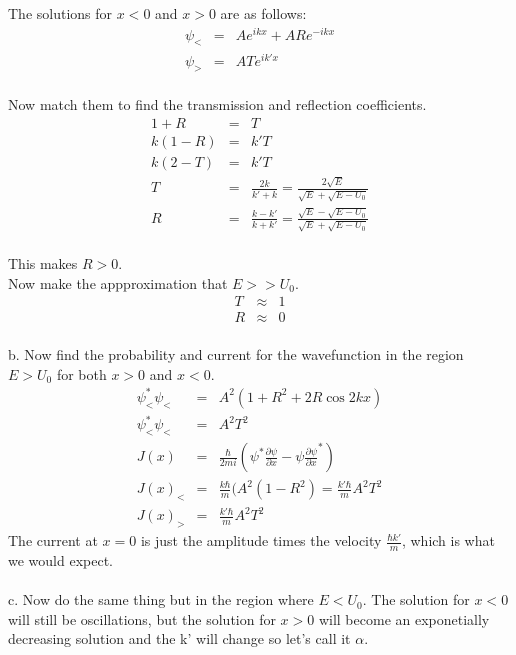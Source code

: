 \documentclass[11pt]{amsart}
\begin{document}
The solutions for $x<0$ and $x>0$ are as follows: \\
\begin{eqnarray*} 
\psi_{<} &=& Ae^{ikx}+ARe^{-ikx} \\
\psi_{>} &=& ATe^{ik'x} 
\end{eqnarray*} \\
Now match them to find the transmission and reflection coefficients. \\
\begin{eqnarray*} 
1+R &=& T \\
k(1-R) &=& k'T \\
 k(2-T) &=& k'T \\
T &=& \frac{2k}{k'+k} = \frac{2\sqrt{E}}{\sqrt{E}+\sqrt{E-U_{0}}} \\
R &=& \frac{k-k'}{k+k'} = \frac{\sqrt{E}-\sqrt{E-U_{0}}}{\sqrt{E}+\sqrt{E-U_{0}}} 
\end{eqnarray*} \\
This makes $R>0$. \\ Now make the appproximation that $E>>U_{0}$. \\
\begin{eqnarray*} 
T &\approx& 1 \\
R &\approx& 0 
\end{eqnarray*} \\
b. Now find the probability and current for the wavefunction in the region $E>U_{0}$ for both $x>0$ and $x<0$. \\
\begin{eqnarray*}
\psi_{<}^{*}\psi_{<} &=&  A^{2}(1+R^{2}+2R\cos{2kx}) \\ 
\psi_{<}^{*}\psi_{<} &=& A^{2}T^{2} \\
J(x) &=& \frac{\hbar}{2mi}(\psi^{*}\frac{\partial{\psi}}{\partial{x}}-\psi\frac{\partial{\psi}}{\partial{x}}^{*}) \\
J(x)_{<} &=& \frac{k\hbar}{m}(A^{2}(1-R^{2}) = \frac{k'\hbar}{m}A^{2}T^{2} \\
J(x)_{>} &=& \frac{k'\hbar}{m}A^{2}T^{2} 
\end{eqnarray*} 
The current at $x=0$ is just the amplitude times the velocity $\frac{\hbar{k'}}{m}$, which is what we would expect. \\ \\
c. Now do the same thing but in the region where $E<U_{0}$. The solution for $x<0$ will still be oscillations, but the solution for $x>0$ will become an exponetially decreasing solution and the k' will change so let's call it $\alpha$. \\
\end{document}
